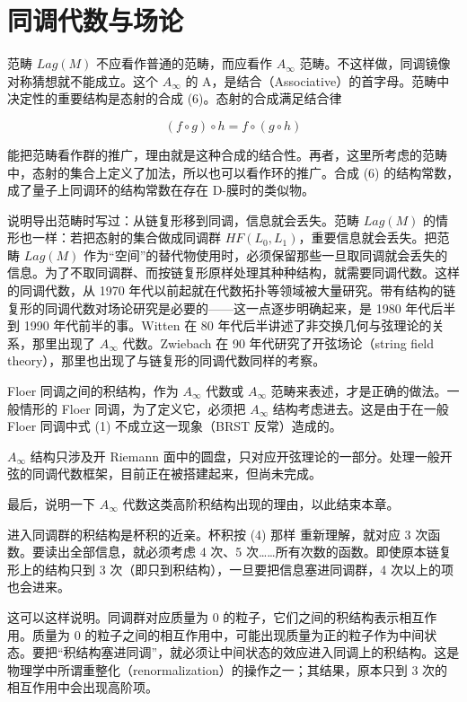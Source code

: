\section{同调代数与场论}

范畴 $Lag(M)$ 不应看作普通的范畴，而应看作 $A_\infty$ 范畴。不这样做，同调镜像对称猜想就不能成立。这个
$A_\infty$ 的 A，是结合（Associative）的首字母。范畴中决定性的重要结构是态射的合成 (6)。态射的合成满足结合律

\[
  (f\circ g)\circ h = f\circ(g\circ h) \tag{8}
\]

能把范畴看作群的推广，理由就是这种合成的结合性。再者，这里所考虑的范畴中，态射的集合上定义了加法，所以也可以看作环的推广。合成 (6) 的结构常数，成了量子上同调环的结构常数在存在 D-膜时的类似物。

说明导出范畴时写过：从链复形移到同调，信息就会丢失。范畴 $Lag(M)$ 的情形也一样：若把态射的集合做成同调群 $HF(L_0,L_1)$，重要信息就会丢失。把范畴 $Lag(M)$ 作为“空间”的替代物使用时，必须保留那些一旦取同调就会丢失的信息。为了不取同调群、而按链复形原样处理其种种结构，就需要同调代数。这样的同调代数，从 1970 年代以前起就在代数拓扑等领域被大量研究。带有结构的链复形的同调代数对场论研究是必要的——这一点逐步明确起来，是 1980 年代后半到 1990 年代前半的事。Witten 在 80 年代后半讲述了非交换几何与弦理论的关系，那里出现了 $A_\infty$ 代数。Zwiebach 在 90 年代研究了开弦场论（string field theory），那里也出现了与链复形的同调代数同样的考察。

Floer 同调之间的积结构，作为 $A_\infty$ 代数或 $A_\infty$ 范畴来表述，才是正确的做法。一般情形的 Floer 同调，为了定义它，必须把 $A_\infty$ 结构考虑进去。这是由于在一般 Floer 同调中式 (1) 不成立这一现象（BRST 反常）造成的。


$A_\infty$ 结构只涉及开 Riemann 面中的圆盘，只对应开弦理论的一部分。处理一般开弦的同调代数框架，目前正在被搭建起来，但尚未完成。

最后，说明一下 $A_\infty$ 代数这类高阶积结构出现的理由，以此结束本章。

进入同调群的积结构是杯积的近亲。杯积按 (4) 那样
重新理解，就对应 3 次函数。要读出全部信息，就必须考虑 4 次、5 次……所有次数的函数。即使原本链复形上的结构只到 3 次（即只到积结构），一旦要把信息塞进同调群，4 次以上的项也会进来。

这可以这样说明。同调群对应质量为 0 的粒子，它们之间的积结构表示相互作用。质量为 0 的粒子之间的相互作用中，可能出现质量为正的粒子作为中间状态。要把“积结构塞进同调”，就必须让中间状态的效应进入同调上的积结构。这是物理学中所谓重整化（renormalization）的操作之一；其结果，原本只到 3 次的相互作用中会出现高阶项。

